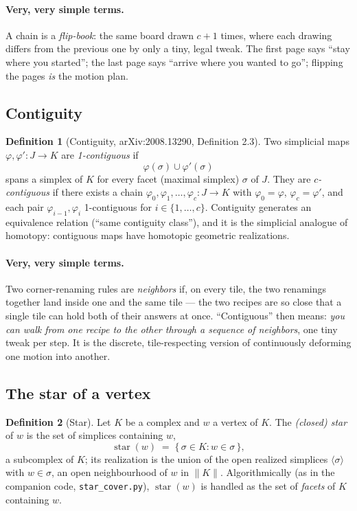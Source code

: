 \documentclass[11pt]{article}
\theoremstyle{definition}
\newtheorem{definition}{Definition}
\begin{document}
\paragraph{Very, very simple terms.}
A chain is a \emph{flip-book}: the same board drawn $c+1$ times, where each
drawing differs from the previous one by only a tiny, legal tweak. The first
page says ``stay where you started''; the last page says ``arrive where you
wanted to go''; flipping the pages \emph{is} the motion plan.

\subsection{Contiguity}

\begin{definition}[Contiguity, arXiv:2008.13290, Definition 2.3]
\label{def:contiguity}
Two simplicial maps $\varphi, \varphi' : J \to K$ are \emph{1-contiguous} if
\[
\varphi(\sigma) \cup \varphi'(\sigma)
\]
spans a simplex of $K$ for every facet (maximal simplex) $\sigma$ of $J$. They
are \emph{$c$-contiguous} if there exists a chain
$\varphi_0, \varphi_1, \dots, \varphi_c : J \to K$ with $\varphi_0 = \varphi$,
$\varphi_c = \varphi'$, and each pair $\varphi_{i-1}, \varphi_i$ 1-contiguous
for $i \in \{1, \dots, c\}$. Contiguity generates an equivalence relation
(``same contiguity class''), and it is the simplicial analogue of homotopy:
contiguous maps have homotopic geometric realizations.
\end{definition}

\paragraph{Very, very simple terms.}
Two corner-renaming rules are \emph{neighbors} if, on every tile, the two
renamings together land inside one and the same tile --- the two recipes are so
close that a single tile can hold both of their answers at once. ``Contiguous''
then means: \emph{you can walk from one recipe to the other through a sequence
of neighbors}, one tiny tweak per step. It is the discrete, tile-respecting
version of continuously deforming one motion into another.

\subsection{The star of a vertex}

\begin{definition}[Star]
Let $K$ be a complex and $w$ a vertex of $K$. The \emph{(closed) star} of $w$
is the set of simplices containing $w$,
\[
\operatorname{star}(w) \;=\; \{\, \sigma \in K : w \in \sigma \,\},
\]
a subcomplex of $K$; its realization is the union of the open realized
simplices $\langle\sigma\rangle$ with $w \in \sigma$, an open neighbourhood of
$w$ in $\lVert K\rVert$. Algorithmically (as in the companion code,
\texttt{star\_cover.py}), $\operatorname{star}(w)$ is handled as the set of
\emph{facets} of $K$ containing $w$.
\end{definition}
\end{document}
